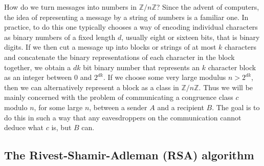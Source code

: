 \documentclass{article}
\newcommand{\Z}{\mathbb{Z}}
\theoremstyle{definition}\newtheorem{definition}{Definition}
\theoremstyle{definition}\newtheorem{remark}[definition]{Remark}
\theoremstyle{definition}\newtheorem*{example}{Example}
\theoremstyle{definition}\newtheorem*{note}{Note}
\begin{document}
How do we turn messages into numbers in $ \Z / n\Z $? Since the advent of computers, the idea of representing a message by a string of numbers is a familiar one. In practice, to do this one typically chooses a way of encoding individual characters as binary numbers of a fixed length $ d $, usually eight or sixteen bits, that is binary digits. If we then cut a message up into blocks or strings of at most $ k $ characters and concatenate the binary representations of each character in the block together, we obtain a $ dk $ bit binary number that represents an $ k $ character block as an integer between $ 0 $ and $ 2^{dk} $. If we choose some very large modulus $ n > 2^{dk} $, then we can alternatively represent a block as a class in $ \Z / n\Z $. Thus we will be mainly concerned with the problem of communicating a congruence class $ c $ modulo $ n $, for some large $ n $, between a sender $ A $ and a recipient $ B $. The goal is to do this in such a way that any eavesdroppers on the communication cannot deduce what $ c $ is, but $ B $ can.

\subsection{The Rivest-Shamir-Adleman (RSA) algorithm}
\end{document}
